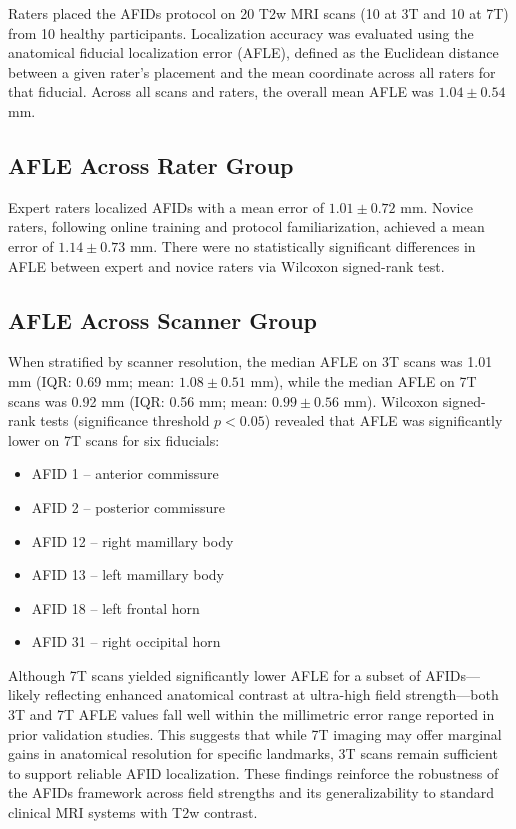 Raters placed the AFIDs protocol on 20 T2w MRI scans (10 at 3T and 10 at 7T) from 10 healthy participants. Localization accuracy was evaluated using the anatomical fiducial localization error (AFLE), defined as the Euclidean distance between a given rater’s placement and the mean coordinate across all raters for that fiducial. Across all scans and raters, the overall mean AFLE was $1.04 \pm 0.54$ mm. 

\subsection{AFLE Across Rater Group}
Expert raters localized AFIDs with a mean error of $1.01 \pm 0.72$ mm. Novice raters, following online training and protocol familiarization, achieved a mean error of $1.14 \pm 0.73$ mm. There were no statistically significant differences in AFLE between expert and novice raters via Wilcoxon signed-rank test.


\subsection{AFLE Across Scanner Group}
When stratified by scanner resolution, the median AFLE on 3T scans was 1.01 mm (IQR: 0.69 mm; mean: $1.08 \pm 0.51$ mm), while the median AFLE on 7T scans was 0.92 mm (IQR: 0.56 mm; mean: $0.99 \pm 0.56$ mm).
Wilcoxon signed-rank tests (significance threshold $p < 0.05$) revealed that AFLE was significantly lower on 7T scans for six fiducials:
\begin{itemize}[noitemsep]
    \item AFID 1 – anterior commissure
    \item AFID 2 – posterior commissure
    \item AFID 12 – right mamillary body
    \item AFID 13 – left mamillary body
    \item AFID 18 – left frontal horn
    \item AFID 31 – right occipital horn
\end{itemize}

Although 7T scans yielded significantly lower AFLE for a subset of AFIDs—likely reflecting enhanced anatomical contrast at ultra-high field strength—both 3T and 7T AFLE values fall well within the millimetric error range reported in prior validation studies. This suggests that while 7T imaging may offer marginal gains in anatomical resolution for specific landmarks, 3T scans remain sufficient to support reliable AFID localization. These findings reinforce the robustness of the AFIDs framework across field strengths and its generalizability to standard clinical MRI systems with T2w contrast.

